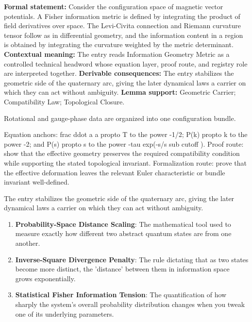 \begingroup\footnotesize\setlength{\emergencystretch}{3em}\sloppy
\textbf{Formal statement:} Consider the configuration space of magnetic vector potentials. A Fisher information metric is defined by integrating the product of field derivatives over space. The Levi-Civita connection and Riemann curvature tensor follow as in differential geometry, and the information content in a region is obtained by integrating the curvature weighted by the metric determinant. \textbf{Contextual meaning:} The entry reads Information Geometry Metric as a controlled technical headword whose equation layer, proof route, and registry role are interpreted together. \textbf{Derivable consequences:} The entry stabilizes the geometric side of the quaternary arc, giving the later dynamical laws a carrier on which they can act without ambiguity. \textbf{Lemma support:} Geometric Carrier; Compatibility Law; Topological Closure.\par
\endgroup

Rotational and gauge-phase data are organized into one configuration bundle.

Equation anchors: frac ddot a a propto T to the power -1/2; P(k) propto k to the power -2; and P(s) propto s to the power -tau exp(-s/s sub cutoff ). Proof route: show that the effective geometry preserves the required compatibility condition while supporting the stated topological invariant. Formalization route: prove that the effective deformation leaves the relevant Euler characteristic or bundle invariant well-defined.

The entry stabilizes the geometric side of the quaternary arc, giving the later dynamical laws a carrier on which they can act without ambiguity.
\endgroup

\begin{enumerate}[leftmargin=1.6em,itemsep=6pt,topsep=4pt]
\item \textbf{Probability-Space Distance Scaling}: The mathematical tool used to measure exactly how different two abstract quantum states are from one another.
\item \textbf{Inverse-Square Divergence Penalty}: The rule dictating that as two states become more distinct, the 'distance' between them in information space grows exponentially.
\item \textbf{Statistical Fisher Information Tension}: The quantification of how sharply the system's overall probability distribution changes when you tweak one of its underlying parameters.
\end{enumerate}

